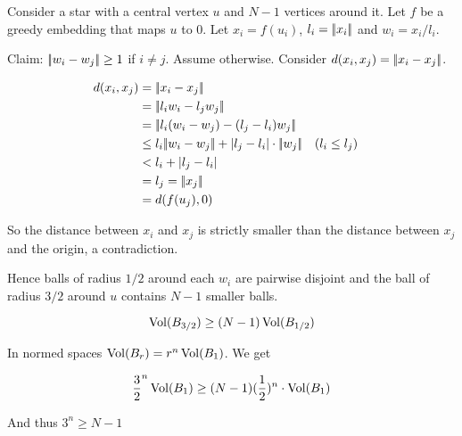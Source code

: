\begin{pr} Consider a star with a central vertex $u$ and $N-1$ vertices around it. Let $f$ be a greedy embedding that maps $u$ to $0$. Let $x_i=f(u_i)$, $l_i=|\!|x_i|\!|$ and $w_i = x_i/l_i$.

Claim: $|\!|w_i-w_j|\!| \geq 1$ if $i\neq j$. Assume otherwise. Consider $d(x_i,x_j)=|\!|x_i-x_j|\!|$.

\begin{align*}
d(x_i,x_j)&=\norm{x_i - x_j} \\
	&=\norm{l_iw_i - l_jw_j}\\
	&=\norm{l_i(w_i-w_j) -(l_j-l_i)w_j}\\
  &\leq l_i \norm{w_i-w_j} + |l_j-l_i|\cdot \norm{w_j} && (l_i\leq l_j)\\
  &< l_i + |l_j-l_i|\\
  &=l_j = \norm{x_j}\\
  &=d(f(u_j),0)
\end{align*}

So the distance between $x_i$ and $x_j$ is strictly smaller than the distance between $x_j$ and the origin, a contradiction.

Hence balls of radius $1/2$ around each $w_i$ are pairwise disjoint and the ball of radius $3/2$ around $u$ contains $N-1$ smaller balls.

\[\operatorname{Vol}(B_{3/2}) \geq (N-1)\operatorname{Vol}(B_{1/2})\]

In normed spaces $\operatorname{Vol}(B_r) = r^n \operatorname{Vol}(B_1)$. We get

\[\frac{3}{2}^n \operatorname{Vol}(B_1) \geq (N-1)(\frac{1}{2})^n \cdot \operatorname{Vol}(B_1)\]

And thus $3^n\geq N-1$
\end{pr}